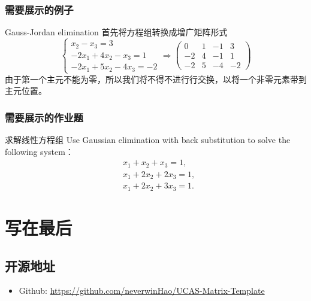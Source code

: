 \documentclass[10pt, a4paper]{article}
\begin{document}
\subsubsection{需要展示的例子}

\begin{example}{Gauss-Jordan elimination}
首先将方程组转换成增广矩阵形式
$$
\left\{\begin{array}{r}
x_{2}-x_{3}=3 \\
-2 x_{1}+4 x_{2}-x_{3}=1 \\
-2 x_{1}+5 x_{2}-4 x_{3}=-2
\end{array} \Longrightarrow\left(\begin{array}{rrr|r}
0 & 1 & -1 & 3 \\
-2 & 4 & -1 & 1 \\
-2 & 5 & -4 & -2
\end{array}\right)\right.
$$
由于第一个主元不能为零，所以我们将不得不进行行交换，以将一个非零元素带到主元位置。
\end{example}

\subsubsection{需要展示的作业题}
\begin{exercise}{求解线性方程组}
Use Gaussian elimination with back substitution to solve the following system：
$$
\begin{aligned}
& x_{1}+x_{2}+x_{3}=1, \\
& x_{1}+2 x_{2}+2 x_{3}=1, \\
& x_{1}+2 x_{2}+3 x_{3}=1 .
\end{aligned}
$$
\end{exercise}


\section{写在最后}
\subsection{开源地址}
\begin{itemize}
    \item Github: \url{https://github.com/neverwinHao/UCAS-Matrix-Template}
\end{itemize}
\end{document}
